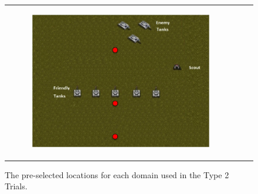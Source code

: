 \documentclass[11pt,letterpaper]{article}
\begin{document}
\begin{figure}
{\begin{tabular}{ccc}
\begin{subfigure}[b]{0.3\textwidth}\includegraphics[width=\textwidth]{figures/tanks-close-points.png}\caption{}\label{fig:tanks-points}\end{subfigure}\\
\end{tabular}
}
\caption{The pre-selected locations for each domain used in the Type 2 Trials.}
\label{fig:locations}
\end{figure}
\end{document}

